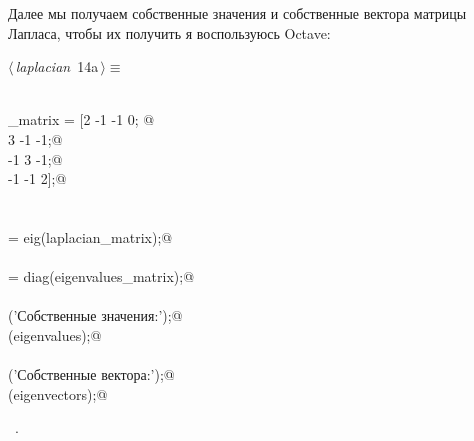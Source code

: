 \documentclass{article}
\begin{document}
Далее мы получаем собственные значения и собственные вектора матрицы Лапласа, чтобы их получить я воспользуюсь Octave:

\begin{flushleft} \small
\begin{minipage}{\linewidth}\label{scrap18}\raggedright\small
{} $\langle\,${\itshape laplacian}\nobreak\ {\footnotesize {14a}}$\,\rangle\equiv$
\vspace{-1ex}
\begin{list}{}{} \item
\mbox{}\verb@@\\
\mbox{}\verb@laplacian_matrix = [2 -1 -1 0;                @\\
\mbox{} 3 -1 -1;@\\
\mbox{} -1 3 -1;@\\
\mbox{} -1 -1 2];@\\
\mbox{}\verb@@\\
\mbox{}\verb@@\\
\mbox{} = eig(laplacian_matrix);@\\
\mbox{}\verb@@\\
\mbox{}\verb@eigenvalues = diag(eigenvalues_matrix);@\\
\mbox{}\verb@@\\
\mbox{}\verb@disp('Собственные значения:');@\\
\mbox{}\verb@disp(eigenvalues);@\\
\mbox{}\verb@@\\
\mbox{}\verb@disp('Собственные вектора:');@\\
\mbox{}\verb@disp(eigenvectors);@\\
\mbox{}\verb@@{\NWsep}
\end{list}
\vspace{-1.5ex}
\footnotesize
\begin{list}{}{\setlength{\itemsep}{-\parsep}\setlength{\itemindent}{-\leftmargin}}
\item \NWtxtMacroRefIn\ .

\item{}
\end{list}
\end{minipage}\vspace{4ex}
\end{flushleft}
\end{document}
